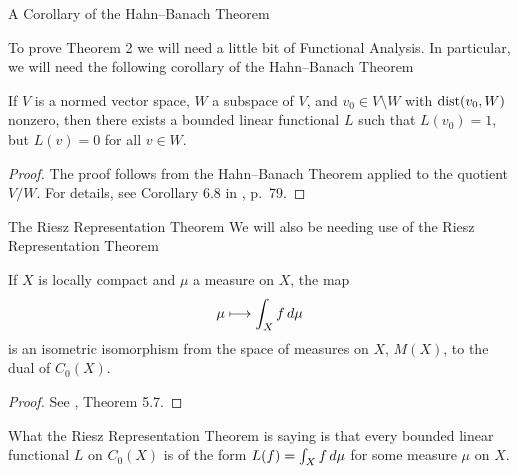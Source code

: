 \documentclass[11pt,letterpaper]{beamer}
\begin{document}
\begin{frame}{A Corollary of the Hahn--Banach Theorem}

  To prove Theorem 2 we will need a little bit of Functional Analysis. In
  particular, we will need the following corollary of the Hahn--Banach Theorem
  \begin{corollary}
    If $V$ is a normed vector space, $W$ a subspace of $V$, and $v_0\in
    V\setminus W$ with $\operatorname{dist}(v_0,W)$ nonzero, then there exists a
    bounded linear functional $L$ such that $L(v_0)=1$, but $L(v)=0$ for all
    $v\in W$.
  \end{corollary}
  \begin{proof}
    The proof follows from the Hahn--Banach Theorem applied to the quotient
    $V/W$. For details, see Corollary 6.8 in \cite{conway}, p.\ 79.
  \end{proof}
\end{frame}

\begin{frame}{The Riesz Representation Theorem}
  We will also be needing use of the Riesz Representation Theorem
  \begin{theorem}
    If $X$ is locally compact and $\mu$ a measure on $X$, the map
    \[
      \mu\longmapsto\int_X f\mathop{}\!d\mu
    \]
    is an isometric isomorphism from the space of measures on $X$, $M(X)$, to
    the dual of $C_0(X)$.
  \end{theorem}
  \begin{proof}
    See \cite{conway}, Theorem 5.7.
  \end{proof}
  What the Riesz Representation Theorem is saying is that every bounded linear
  functional $L$ on $C_0(X)$ is of the form $L(f)=\int_X f\mathop{}\!d \mu$ for some
  measure $\mu$ on $X$.
\end{frame}
\end{document}
